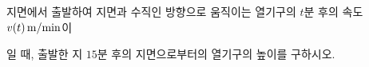 지면에서 출발하여 지면과 수직인 방향으로 움직이는 열기구의 $t$분 후의 속도 $v(t)\mkern3mu \mathrm{m/min}$이 \par\smallskip{}\par\smallskip\noindent 일 때, 출발한 지 $15$분 후의 지면으로부터의 열기구의 높이를 구하시오.
